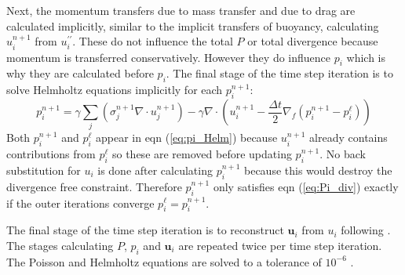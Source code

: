 \documentclass[draft]{agujournal2019}
\begin{document}
Next, the momentum transfers due to mass transfer and due to drag
are calculated implicitly, similar to the implicit transfers of buoyancy,
calculating $u_{i}^{n+1}$ from $u_{i}^{\prime\prime}$. These do
not influence the total $P$ or total divergence because momentum
is transferred conservatively. However they do influence $p_{i}$
which is why they are calculated before $p_{i}$. The final stage
of the time step iteration is to solve Helmholtz equations implicitly for each
$p_{i}^{n+1}$:
\begin{equation}
p_{i}^{n+1} = \gamma \sum_j \left(\sigma^{n+1}_j \nabla\cdot u_j^{n+1} \right)
-\gamma\nabla\cdot
\left(u_{i}^{n+1}-\frac{\Delta t}{2}\nabla_{f}\left(p_{i}^{n+1}-p_{i}^{\ell}\right)\right)
\label{eq:pi_Helm}
\end{equation}
Both $p_{i}^{n+1}$ and $p_{i}^{\ell}$ appear in eqn (\ref{eq:pi_Helm})
because $u_{i}^{n+1}$ already contains contributions from $p_{i}^{\ell}$
so these are removed before updating $p_{i}^{n+1}$. No back substitution
for $u_{i}$ is done after calculating $p_{i}^{n+1}$ because this
would destroy the divergence free constraint. Therefore $p_{i}^{n+1}$
only satisfies eqn (\ref{eq:Pi_div}) exactly if the outer iterations
converge  $p_{i}^{\ell}=p_{i}^{n+1}$. 

The final stage of the time step iteration is to reconstruct $\mathbf{u}_{i}$
from $u_{i}$ following . The stages calculating $P$,
$p_{i}$ and $\mathbf{u}_{i}$ are repeated twice per time step iteration.
The Poisson and Helmholtz equations are solved to a tolerance of $10^{-6}$
.

\subsection{\label{sec:cAveraging} }

\end{document}
